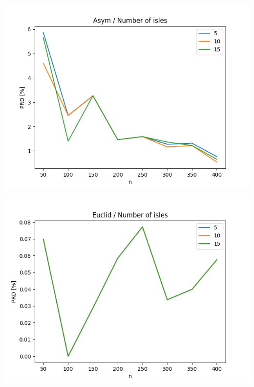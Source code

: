 \documentclass{article}
\begin{document}
\begin{center}
\includegraphics[width=\textwidth, 
                   height = 0.4\textheight, 
                   keepaspectratio]
                  {plots/asym_10_isles} 
\end{center}

\begin{center}
\includegraphics[width=\textwidth, 
                   height = 0.4\textheight, 
                   keepaspectratio]
                  {plots/euclid_10_isles} 
\end{center}
\end{document}
